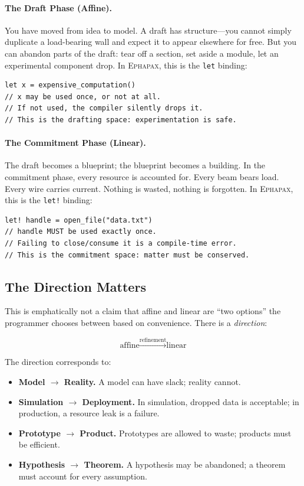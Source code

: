 \documentclass[11pt,a4paper]{article}
\newcommand{\ephapax}{\textsc{Ephapax}}
\newcommand{\letbang}{\texttt{let!}}
\newcommand{\letkw}{\texttt{let}}
\begin{document}
\paragraph{The Draft Phase (Affine).}
You have moved from idea to model. A draft has structure---you cannot
simply duplicate a load-bearing wall and expect it to appear
elsewhere for free. But you can abandon parts of the draft: tear off
a section, set aside a module, let an experimental component drop. In
\ephapax{}, this is the \letkw{} binding:

\begin{lstlisting}
let x = expensive_computation()
// x may be used once, or not at all.
// If not used, the compiler silently drops it.
// This is the drafting space: experimentation is safe.
\end{lstlisting}

\paragraph{The Commitment Phase (Linear).}
The draft becomes a blueprint; the blueprint becomes a building. In
the commitment phase, every resource is accounted for. Every beam
bears load. Every wire carries current. Nothing is wasted, nothing is
forgotten. In \ephapax{}, this is the \letbang{} binding:

\begin{lstlisting}
let! handle = open_file("data.txt")
// handle MUST be used exactly once.
// Failing to close/consume it is a compile-time error.
// This is the commitment space: matter must be conserved.
\end{lstlisting}

\subsection{The Direction Matters}

This is emphatically not a claim that affine and linear are ``two
options'' the programmer chooses between based on convenience. There
is a \emph{direction}:

\[
  \text{affine} \xrightarrow{\text{refinement}} \text{linear}
\]

The direction corresponds to:

\begin{itemize}
\item \textbf{Model $\to$ Reality.} A model can have slack; reality
  cannot.
\item \textbf{Simulation $\to$ Deployment.} In simulation, dropped
  data is acceptable; in production, a resource leak is a failure.
\item \textbf{Prototype $\to$ Product.} Prototypes are allowed to
  waste; products must be efficient.
\item \textbf{Hypothesis $\to$ Theorem.} A hypothesis may be
  abandoned; a theorem must account for every assumption.
\end{itemize}
\end{document}
